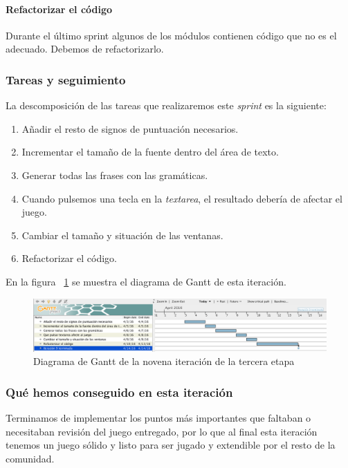 \paragraph{Refactorizar el código} Durante el último sprint algunos de los módulos contienen código que no es el adecuado. Debemos de refactorizarlo.

\subsubsection{Tareas y seguimiento}

La descomposición de las tareas que realizaremos este \textit{sprint} es la siguiente:

\begin{enumerate}[label=\bfseries WBS 9.\arabic*]
  \item Añadir el resto de signos de puntuación necesarios.
  \item Incrementar el tamaño de la fuente dentro del área de texto.
  \item Generar todas las frases con las gramáticas.
  \item Cuando pulsemos una tecla en la \textit{textarea}, el resultado debería de afectar el juego.
  \item Cambiar el tamaño y situación de las ventanas.
  \item Refactorizar el código.
\end{enumerate}

En la figura ~\ref{fig:sec3it9} se muestra el diagrama de Gantt de esta iteración.

\begin{figure}
    \includegraphics[width=\textwidth,height=\textheight,keepaspectratio]{./img/sec3it9.png}
  \caption{Diagrama de Gantt de la novena iteración de la tercera etapa}
  \label{fig:sec3it9}
\end{figure}

\subsubsection{Qué hemos conseguido en esta iteración}

Terminamos de implementar los puntos más importantes que faltaban o necesitaban revisión del juego entregado, por lo que al final esta iteración tenemos un juego sólido y listo para ser jugado y extendible por el resto de la comunidad.

